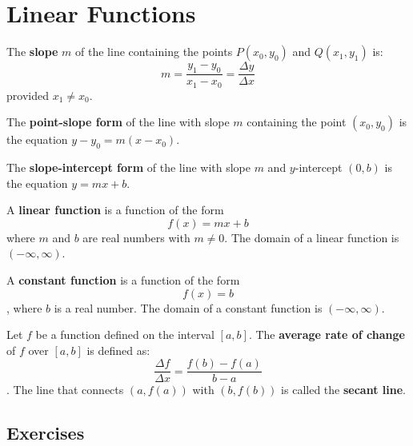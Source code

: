 \section{Linear Functions}

\begin{definition}[Slope]
    The \textbf{slope} $m$ of the line containing the points $P(x_0, y_0)$ and $Q(x_1,y_1)$ is:
    \[m  = \frac{y_1 - y_0}{x_1 - x_0} = \frac{\Delta y}{\Delta x}\]
    provided $x_1 \neq x_0$.
\end{definition}

\begin{definition}
    The \textbf{point-slope form} of the line with slope $m$ containing the point $(x_0, y_0)$ is the equation $y - y_0 = m (x - x_0)$.
\end{definition}

\begin{definition}
    The \textbf{slope-intercept form} of the line with slope $m$ and $y$-intercept $(0,b)$ is the equation $y = mx + b$.
\end{definition}

\begin{definition}
    A \textbf{linear function} is a function of the form
    \[f(x) = mx + b\]
    where $m$ and $b$ are real numbers with $m \neq 0$. The domain of a linear function is $(-\infty,\infty)$.
\end{definition}

\begin{definition}
    A \textbf{constant function} is a function of the form
    \[f(x) = b\],
    where $b$ is a real number. The domain of a constant function is $(-\infty, \infty)$.
\end{definition}

\begin{definition}
    Let $f$ be a function defined on the interval $[a, b]$. The \textbf{average rate of change} of $f$ over $[a,b]$ is defined as:
    \[\frac{\Delta f}{\Delta x} = \frac{f(b) - f(a)}{b - a}\].
    The line that connects $(a, f(a))$ with $(b, f(b))$ is called the \textbf{secant line}.
\end{definition}

\subsection{Exercises}

